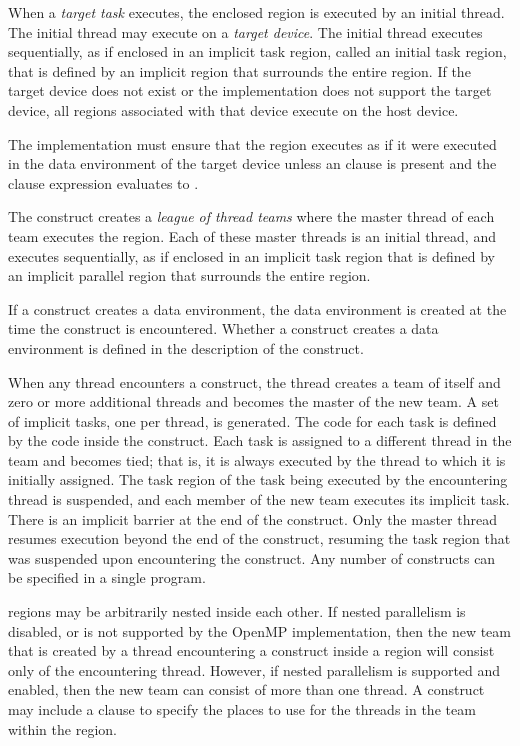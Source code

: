 When a \emph{target task} executes, the enclosed  region is executed by an initial 
thread.  The initial thread may execute on a \emph{target device}.  The initial thread executes 
sequentially, as if enclosed in an implicit task region, called an initial task region, that is 
defined by an implicit  region that surrounds the entire  
region.  If the target device does not exist or the implementation does not support the target 
device, all  regions associated with that device execute on the host device.

The implementation must ensure that the  region executes as if it were executed in the data environment of the target device unless an  clause is present and the  clause expression evaluates to .

The  construct creates a \emph{league of thread teams} 
where the master thread of each
team executes the region. Each of these master threads is an initial thread, and executes
sequentially, as if enclosed in an implicit task region that is defined by an implicit
parallel region that surrounds the entire  region.

If a construct creates a data environment, the data environment is created at the time the
construct is encountered. Whether a construct creates a data environment is defined in 
the description of the construct.

When any thread encounters a  construct, the thread creates a team of itself
and zero or more additional threads and becomes the master of the new team. A set of 
implicit tasks, one per thread, is generated. The code for each task is defined by the code 
inside the  construct. Each task is assigned to a different thread in the team
and becomes tied; that is, it is always executed by the thread to which it is initially 
assigned. The task region of the task being executed by the encountering thread is 
suspended, and each member of the new team executes its implicit task. There is an 
implicit barrier at the end of the  construct. Only the master thread resumes
execution beyond the end of the  construct, resuming the task region that
was suspended upon encountering the  construct. Any number of
 constructs can be specified in a single program.

 regions may be arbitrarily nested inside each other. If nested parallelism is
disabled, or is not supported by the OpenMP implementation, then the new team that is 
created by a thread encountering a  construct inside a  region
will consist only of the encountering thread. However, if nested parallelism is supported 
and enabled, then the new team can consist of more than one thread. A 
construct may include a  clause to specify the places to use for the threads
in the team within the  region.

